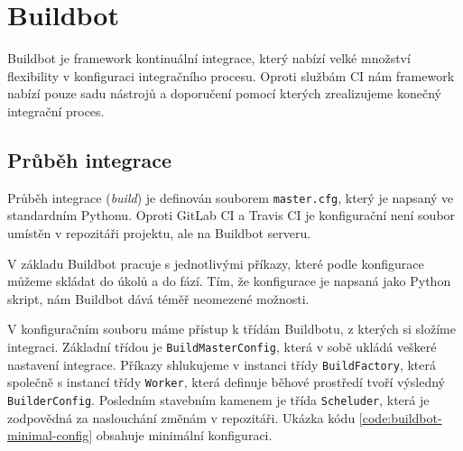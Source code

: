 \chapter{Buildbot}

Buildbot je framework kontinuální integrace, který nabízí velké množství flexibility v konfiguraci integračního procesu.
Oproti službám CI nám framework nabízí pouze sadu nástrojů a doporučení pomocí kterých zrealizujeme konečný integrační proces.

\section{Průběh integrace}

Průběh integrace (\textit{build}) je definován souborem \verb|master.cfg|, který je napsaný ve standardním Pythonu.
Oproti GitLab CI a Travis CI je konfigurační není soubor umístěn v repozitáři projektu, ale na Buildbot serveru.

V základu Buildbot pracuje s jednotlivými příkazy, které podle konfigurace můžeme skládat do úkolů a do fází.
Tím, že konfigurace je napsaná jako Python skript, nám Buildbot dává téměř neomezené možnosti.

V konfiguračním souboru máme přístup k třídám Buildbotu, z kterých si složíme integraci.
Základní třídou je \verb|BuildMasterConfig|, která v sobě ukládá veškeré nastavení integrace.
Příkazy shlukujeme v instanci třídy \verb|BuildFactory|, která společně s instancí třídy \verb|Worker|, která definuje běhové prostředí tvoří výsledný \verb|BuilderConfig|.
Posledním stavebním kamenem je třída \verb|Scheluder|, která je zodpovědná za naslouchání změnám v repozitáři.
Ukázka kódu \ref{code:buildbot-minimal-config} obsahuje minimální konfiguraci.

